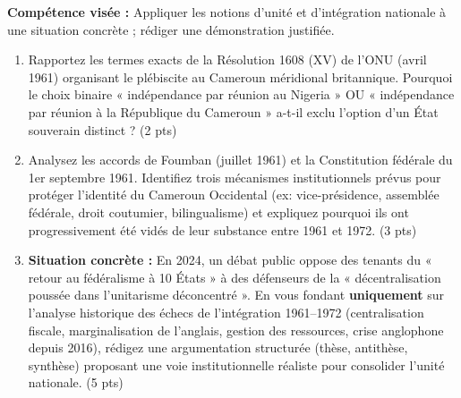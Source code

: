 \documentclass[11pt]{article}
\begin{document}
\begin{exercice}
\textbf{Compétence visée :} Appliquer les notions d'unité et d'intégration nationale à une situation concrète ; rédiger une démonstration justifiée.
\begin{enumerate}
    \item Rapportez les termes exacts de la Résolution 1608 (XV) de l'ONU (avril 1961) organisant le plébiscite au Cameroun méridional britannique. Pourquoi le choix binaire « indépendance par réunion au Nigeria » OU « indépendance par réunion à la République du Cameroun » a-t-il exclu l'option d'un État souverain distinct ? (2 pts)
    \item Analysez les accords de Foumban (juillet 1961) et la Constitution fédérale du 1er septembre 1961. Identifiez trois mécanismes institutionnels prévus pour protéger l'identité du Cameroun Occidental (ex: vice-présidence, assemblée fédérale, droit coutumier, bilingualisme) et expliquez pourquoi ils ont progressivement été vidés de leur substance entre 1961 et 1972. (3 pts)
    \item \textbf{Situation concrète :} En 2024, un débat public oppose des tenants du « retour au fédéralisme à 10 États » à des défenseurs de la « décentralisation poussée dans l'unitarisme déconcentré ». En vous fondant \textbf{uniquement} sur l'analyse historique des échecs de l'intégration 1961--1972 (centralisation fiscale, marginalisation de l'anglais, gestion des ressources, crise anglophone depuis 2016), rédigez une argumentation structurée (thèse, antithèse, synthèse) proposant une voie institutionnelle réaliste pour consolider l'unité nationale. (5 pts)
\end{enumerate}
\end{exercice}
\end{document}
